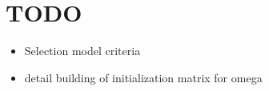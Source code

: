 \documentclass[11pt,a4paper]{article}
\begin{document}
\section{TODO}
 \begin{itemize}
 \item Selection model criteria
 \item detail building of initialization matrix for omega
 \end{itemize}

\newpage

\end{document}

